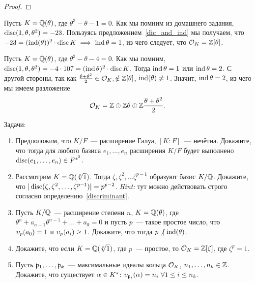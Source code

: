 \begin{definition}
\begin{proof}
		\end{proof}

		\begin{example}
			Пусть $K = \mathbb{Q}(\theta)$, где $\theta^3 - \theta - 1 = 0$. Как мы помним из домашнего задания, $\operatorname{disc}(1, \theta, \theta^2) = -23$.  Пользуясь предложением~\ref{dic_and_ind} мы получаем, что $-23 = (\operatorname{ind}(\theta))^2 \cdot \operatorname{disc}{K} \implies \operatorname{ind}{\theta} = 1$, из чего следует, что $\mathcal{O}_{K} = \mathbb{Z}[\theta]$.
		\end{example}

		\begin{example}
			Пусть $K = \mathbb{Q}(\theta)$, где $\theta^3 - \theta - 4 = 0$. Как мы помним, $\operatorname{disc}(1, \theta, \theta^2) = -4 \cdot 107 = (\operatorname{ind}{\theta})^2 \cdot \operatorname{disc}{K}$, Тогда $\operatorname{ind}{\theta} = 1$ или $\operatorname{ind}{\theta} = 2$. С другой стороны, так как $\frac{\theta + \theta^2}{2} \in \mathcal{O}_{K}, \notin \mathbb{Z}[\theta]$, $\operatorname{ind}(\theta) \neq 1$. Значит, $\operatorname{ind}{\theta} = 2$,  из чего мы имеем разложение 
			\[
				\mathcal{O}_{K} = \mathbb{Z} \oplus \mathbb{Z}\theta \oplus \mathbb{Z} \frac{\theta + \theta^2}{2}.
			\]
		\end{example}

		\begin{homework}
			Задачи:
			\begin{enumerate}
				\item Предположим, что $K/F$~--- расширение Галуа, $[K : F]$~--- нечётна. Докажите, что тогда 
				для любого базиса $e_1, \ldots, e_n$ расширения $K/F$ будет выполнено $\operatorname{disc}(e_1, \ldots, e_n) \in F^{*^{2}}$.

				\item Рассмотрим $K = \mathbb{Q}(\sqrt[p]{1})$. Тогда $\zeta, \zeta^2, \ldots \zeta^{p - 1}$ образуют базис $K/\mathbb{Q}$. Докажите, что $|\operatorname{disc}(\zeta, \zeta^2, \ldots, \zeta^{p - 1})| = p^{p - 2}$.
				\emph{Hint:} тут можно действовать строго согласно определению~\ref{discriminant}.

				\item Пусть $K/\mathbb{Q}$~--- расширение степени $n$, $K = \mathbb{Q}(\theta)$, где $\theta^n + a_{n - 1}\theta^{n - 1} + \ldots + a_0 = 0$ и пусть $p$~--- такое простое число, что $\upsilon_{p}(a_0) = 1$ и $\upsilon_{p}(a_i) \ge 1$. Докажите, что тогда $p \not \ \mid \operatorname{ind}(\theta)$.

				\item Докажите, что если $K = \mathbb{Q}(\sqrt[p]{1})$, где $p$~--- простое, то $\mathcal{O}_{K} = \mathbb{Z}[\zeta]$, где $\zeta^p = 1$.

				\item Пусть $\mathfrak{p}_{1}, \ldots, \mathfrak{p}_{k}$~--- максимальные идеалы кольца $\mathcal{O}_{K}$, $n_{1}, \ldots, n_{k} \in \mathbb{Z}$. Докажите, что существует $\alpha \in K^{*}\colon \upsilon_{\mathfrak{p}_{i}}(\alpha) = n_{i} \ \forall 1 \le i \le n_{k}$.


\end{enumerate}
\end{homework}
\end{definition}
